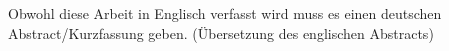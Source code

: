 Obwohl diese Arbeit in Englisch verfasst wird muss es einen deutschen Abstract/Kurzfassung geben. (Übersetzung des englischen Abstracts)
